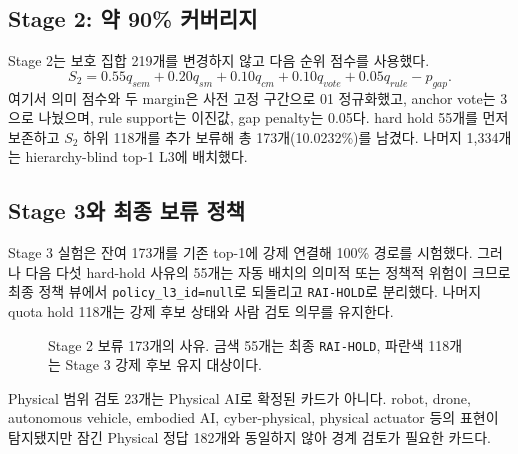 \documentclass[11pt,a4paper]{article}
\newcommand{\code}[1]{\texttt{#1}}
\begin{document}
\subsection{Stage 2: 약 90\% 커버리지}

Stage 2는 보호 집합 219개를 변경하지 않고 다음 순위 점수를 사용했다.
\[
S_2=0.55q_{sem}+0.20q_{sm}+0.10q_{cm}+0.10q_{vote}+0.05q_{rule}-p_{gap}.
\]
여기서 의미 점수와 두 margin은 사전 고정 구간으로 0\textendash{}1 정규화했고, anchor vote는
3으로 나눴으며, rule support는 이진값, gap penalty는 0.05다. hard hold 55개를
먼저 보존하고 $S_2$ 하위 118개를 추가 보류해 총 173개(10.0232\%)를 남겼다.
나머지 1,334개는 hierarchy-blind top-1 L3에 배치했다.

\subsection{Stage 3와 최종 보류 정책}

Stage 3 실험은 잔여 173개를 기존 top-1에 강제 연결해 100\% 경로를 시험했다.
그러나 다음 다섯 hard-hold 사유의 55개는 자동 배치의 의미적 또는 정책적 위험이
크므로 최종 정책 뷰에서 \code{policy\_l3\_id=null}로 되돌리고
\code{RAI-HOLD}로 분리했다. 나머지 quota hold 118개는 강제 후보 상태와 사람
검토 의무를 유지한다.

\begin{figure}[H]
\centering
{}
\caption{Stage 2 보류 173개의 사유. 금색 55개는 최종 \code{RAI-HOLD}, 파란색 118개는 Stage 3 강제 후보 유지 대상이다.}
\end{figure}

Physical 범위 검토 23개는 Physical AI로 확정된 카드가 아니다. robot, drone,
autonomous vehicle, embodied AI, cyber-physical, physical actuator 등의 표현이
탐지됐지만 잠긴 Physical 정답 182개와 동일하지 않아 경계 검토가 필요한 카드다.
\end{document}
